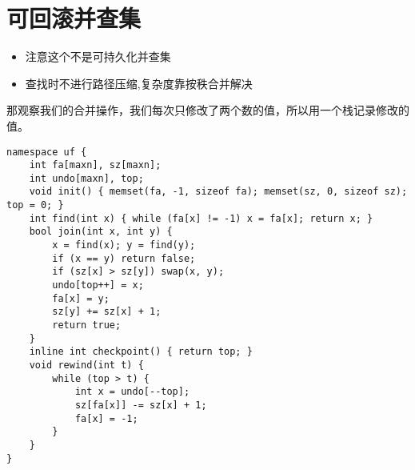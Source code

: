 \section{可回滚并查集}

\begin{itemize}
\item 注意这个不是可持久化并查集
\item 查找时不进行路径压缩,复杂度靠按秩合并解决
\end{itemize}

\par \noindent 那观察我们的合并操作，我们每次只修改了两个数的值，所以用一个栈记录修改的值。

\begin{verbatim}
namespace uf {
    int fa[maxn], sz[maxn];
    int undo[maxn], top;
    void init() { memset(fa, -1, sizeof fa); memset(sz, 0, sizeof sz); top = 0; }
    int find(int x) { while (fa[x] != -1) x = fa[x]; return x; }
    bool join(int x, int y) {
        x = find(x); y = find(y);
        if (x == y) return false;
        if (sz[x] > sz[y]) swap(x, y);
        undo[top++] = x;
        fa[x] = y;
        sz[y] += sz[x] + 1;
        return true;
    }
    inline int checkpoint() { return top; }
    void rewind(int t) {
        while (top > t) {
            int x = undo[--top];
            sz[fa[x]] -= sz[x] + 1;
            fa[x] = -1;
        }
    }
}
\end{verbatim}
